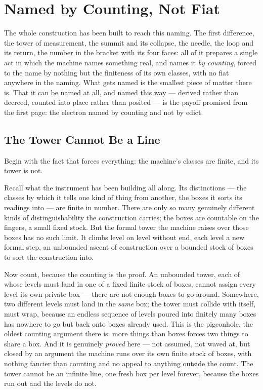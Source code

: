 \chapter{Named by Counting, Not Fiat}

The whole construction has been built to reach this naming. The first difference, the tower of measurement, the
summit and its collapse, the needle, the loop and its return, the number in the bracket with its four faces: all
of it prepares a single act in which the machine names something real, and names it \emph{by counting}, forced to
the name by nothing but the finiteness of its own classes, with no fiat anywhere in the naming. What gets named is
the smallest piece of matter there is. That it can be named at all, and named this way --- derived rather than
decreed, counted into place rather than posited --- is the payoff promised from the first page: the electron named
by counting and not by edict.

\section{The Tower Cannot Be a Line}

Begin with the fact that forces everything: the machine's classes are finite, and its tower is not.

Recall what the instrument has been building all along. Its distinctions --- the classes by which it tells one
kind of thing from another, the boxes it sorts its readings into --- are finite in number. There are only so many
genuinely different kinds of distinguishability the construction carries; the boxes are countable on the fingers,
a small fixed stock. But the formal tower the machine raises over those boxes has no such limit. It climbs level
on level without end, each level a new formal step, an unbounded ascent of construction over a bounded stock of
boxes to sort the construction into.

Now count, because the counting is the proof. An unbounded tower, each of whose levels must land in one of a fixed
finite stock of boxes, cannot assign every level its own private box --- there are not enough boxes to go around.
Somewhere, two different levels must land in the \emph{same} box; the tower must collide with itself, must wrap,
because an endless sequence of levels poured into finitely many boxes has nowhere to go but back onto boxes
already used. This is the pigeonhole, the oldest counting argument there is: more things than boxes forces two
things to share a box. And it is genuinely \emph{proved} here --- not assumed, not waved at, but closed by an
argument the machine runs over its own finite stock of boxes, with nothing fancier than counting and no appeal to
anything outside the count. The tower cannot be an infinite line, one fresh box per level forever, because the
boxes run out and the levels do not.

